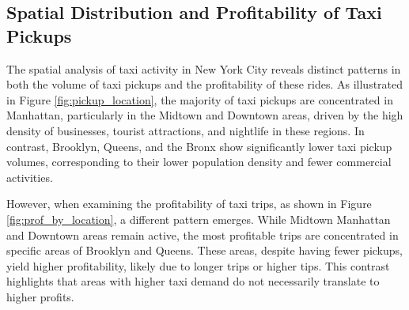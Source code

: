 \documentclass[11pt]{article}
\begin{document}
\subsection{Spatial Distribution and Profitability of Taxi Pickups}

The spatial analysis of taxi activity in New York City reveals distinct patterns in both the volume of taxi pickups and the profitability of these rides. As illustrated in Figure \ref{fig:pickup_location}, the majority of taxi pickups are concentrated in Manhattan, particularly in the Midtown and Downtown areas, driven by the high density of businesses, tourist attractions, and nightlife in these regions. In contrast, Brooklyn, Queens, and the Bronx show significantly lower taxi pickup volumes, corresponding to their lower population density and fewer commercial activities.

However, when examining the profitability of taxi trips, as shown in Figure \ref{fig:prof_by_location}, a different pattern emerges. While Midtown Manhattan and Downtown areas remain active, the most profitable trips are concentrated in specific areas of Brooklyn and Queens. These areas, despite having fewer pickups, yield higher profitability, likely due to longer trips or higher tips. This contrast highlights that areas with higher taxi demand do not necessarily translate to higher profits.
\end{document}
